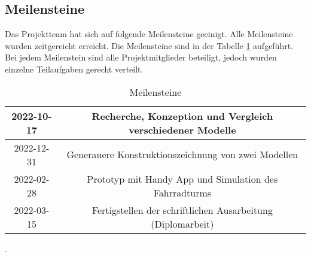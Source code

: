 \subsection{Meilensteine}
Das Projektteam hat sich auf folgende Meilensteine geeinigt. Alle Meilensteine wurden zeitgereicht erreicht. Die Meilensteine sind in der Tabelle \ref{tab:meilensteine} aufgeführt. Bei jedem Meilenstein sind alle Projektmitglieder beteiligt, jedoch wurden einzelne Teilaufgaben gerecht verteilt.

\begin{table}[ht]
  \begin{center}
    \begin{tabular} { |c|c| }
      \hline
      2022-10-17 & Recherche, Konzeption und Vergleich verschiedener Modelle   \\
      \hline
      2022-12-31 & Generauere Konstruktionszeichnung von zwei Modellen         \\
      \hline
      2022-02-28 & Prototyp mit Handy App und Simulation des Fahrradturms      \\
      \hline
      2022-03-15 & Fertigstellen der schriftlichen Ausarbeitung (Diplomarbeit) \\
      \hline
    \end{tabular}
    \caption{Meilensteine}.
    \label{tab:meilensteine}
  \end{center}
\end{table}